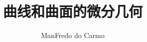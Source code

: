\documentclass[lang=cn,a4paper,11pt,openany,scheme=chinese,twoside]{elegantbook}
\newcommand{\ForceRightPage}{%
  \clearpage
  \ifodd\value{page}\relax
  \else
    \hbox{}\thispagestyle{empty}\newpage
  \fi
}
\begin{document}
\title{曲线和曲面的微分几何}
\author{ManFredo do Carmo}
\date{}
\maketitle
\setcounter{page}{1}

\frontmatter
{}     %
\clearpage
\tableofcontents
\clearpage
\ForceRightPage
\mainmatter





\end{document}
